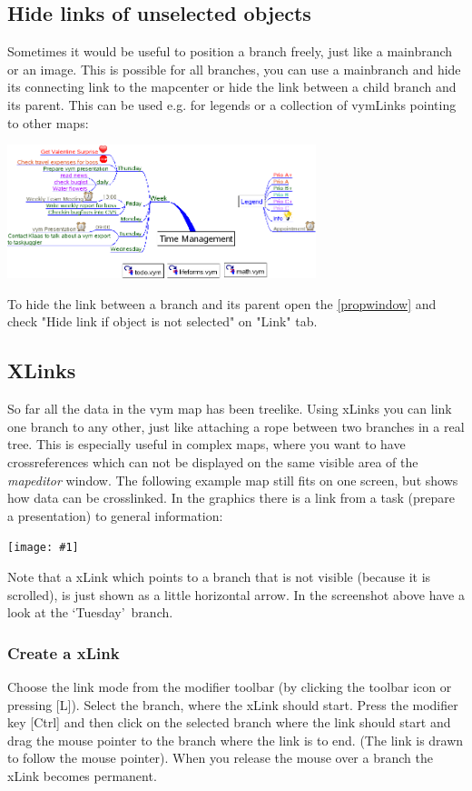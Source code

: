 \documentclass[12pt,a4paper]{article}
\newcommand{\maximage}[1]{  
    \begin{center}
        \texttt{[image: \#1]} 
    \end{center}
}
\newcommand{\vym}{{\sc vym }}
\newcommand{\key}[1]{[#1]}
\begin{document}
\subsection{Hide links of unselected objects} \label{hidelink}
Sometimes it would be useful to position a branch freely, just like a
mainbranch or an image. This is possible for all
branches, you can use a mainbranch and hide its connecting link to the
mapcenter or hide the link between a child branch and its parent. This can be used e.g. for legends or a collection of vymLinks
pointing to other maps:
\begin{center}
    \includegraphics[width=9cm]{images/hiddenlink.png}
\end{center}
To hide the link between a branch and its parent open the
\ref{propwindow} and check "Hide link if object is not selected" on
"Link" tab.


\subsection{XLinks} \label{xlinks}
So far all the data in the \vym map has been treelike. Using xLinks you
can link one branch to any other, just like attaching a rope between two
branches in a real tree. This is especially useful in complex maps,
where you want to have crossreferences which can not be displayed on the same
visible area of the {\em mapeditor} window. The following example map still fits on one screen, but shows how data can be crosslinked. In the graphics there is a link from a task (prepare a presentation) to general information:
    \maximage{images/xlink.png}
Note that a xLink which points to a branch that is not visible (because
it is scrolled), is just shown as a little horizontal arrow. In the
screenshot above have a look at the \lq Tuesday\rq\ branch.

\subsubsection*{Create a xLink}
Choose the link mode from the modifier toolbar (by clicking the toolbar icon or pressing
\key{L}). Select the branch, where the xLink should start. Press the
modifier key \key{Ctrl} and then click on the selected branch where the
link should start and drag the mouse pointer to the branch where the link is to end. (The link is drawn to follow the mouse pointer). When you release the mouse over a branch the xLink becomes permanent.
\end{document}

